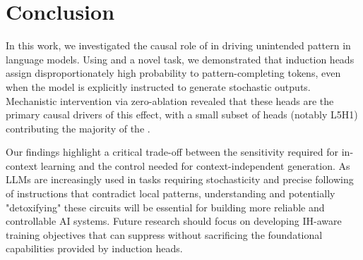 \section{Conclusion}
\label{sec:conclusion}

In this work, we investigated the causal role of \inductionheads in driving unintended pattern \leakage in language models. Using \gpttwo and a novel \taskname task, we demonstrated that induction heads assign disproportionately high probability to pattern-completing tokens, even when the model is explicitly instructed to generate stochastic outputs. Mechanistic intervention via zero-ablation revealed that these heads are the primary causal drivers of this effect, with a small subset of heads (notably L5H1) contributing the majority of the \leakage.

Our findings highlight a critical trade-off between the sensitivity required for in-context learning and the control needed for context-independent generation. As LLMs are increasingly used in tasks requiring stochasticity and precise following of instructions that contradict local patterns, understanding and potentially "detoxifying" these circuits will be essential for building more reliable and controllable AI systems. Future research should focus on developing IH-aware training objectives that can suppress \leakage without sacrificing the foundational capabilities provided by induction heads.
